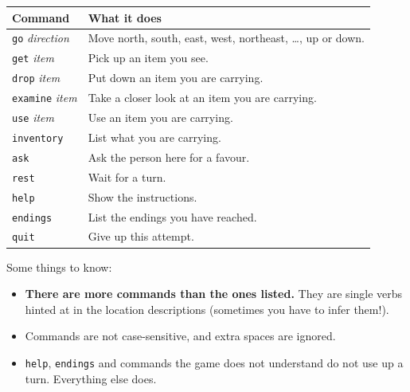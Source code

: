 \documentclass[11pt, a4paper]{article}
\newcommand{\cmd}[1]{\texttt{#1}}
\begin{document}
\begin{center}
\begin{tabularx}{0.9\textwidth}{@{}lX@{}}
  \toprule
  Command & What it does \\
  \midrule
  \cmd{go} \emph{direction}   & Move north, south, east, west, northeast, \dots, up or down. \\
  \cmd{get} \emph{item}       & Pick up an item you see. \\
  \cmd{drop} \emph{item}      & Put down an item you are carrying. \\
  \cmd{examine} \emph{item}   & Take a closer look at an item you are carrying. \\
  \cmd{use} \emph{item}       & Use an item you are carrying. \\
  \cmd{inventory}             & List what you are carrying. \\
  \cmd{ask}                   & Ask the person here for a favour. \\
  \cmd{rest}                  & Wait for a turn. \\
  \cmd{help}                  & Show the instructions. \\
  \cmd{endings}               & List the endings you have reached. \\
  \cmd{quit}                  & Give up this attempt. \\
  \bottomrule
\end{tabularx}
\end{center}

\noindent Some things to know:
\begin{itemize}
  \item \textbf{There are more commands than the ones listed.} They are single verbs hinted at
        in the location descriptions (sometimes you have to infer them!).
  \item Commands are not case-sensitive, and extra spaces are ignored.
  \item \cmd{help}, \cmd{endings} and commands the game does not understand do not use up a turn.
        Everything else does.
\end{itemize}
\end{document}
